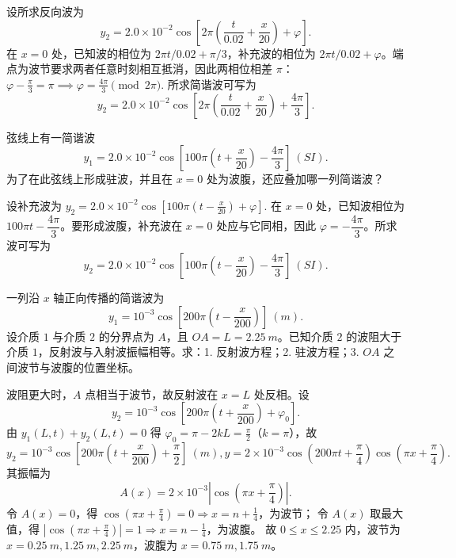 \begin{solution}
设所求反向波为
\[
y_2=2.0\times10^{-2}\cos\!\left[2\pi\left(\frac{t}{0.02}+\frac{x}{20}\right)+\varphi\right].
\]
在 \(x=0\) 处，已知波的相位为 \(2\pi t/0.02+\pi/3\)，补充波的相位为 \(2\pi t/0.02+\varphi\)。端点为波节要求两者任意时刻相互抵消，因此两相位相差 \(\pi\)：
 \(\varphi-\frac{\pi}{3}=\pi \implies \varphi=\frac{4\pi}{3}\pmod{2\pi}.\) 
所求简谐波可写为
\[
y_2=2.0\times10^{-2}\cos\!\left[2\pi\left(\frac{t}{0.02}+\frac{x}{20}\right)+\frac{4\pi}{3}\right].
\]
\end{solution}

\begin{exercise}[2005级期末：补出使 \(x=0\) 为波腹的反向波]
弦线上有一简谐波
\[
y_1=2.0\times10^{-2}\cos\!\left[100\pi\left(t+\frac{x}{20}\right)-\frac{4\pi}{3}\right]\ (\si{SI}).
\]
为了在此弦线上形成驻波，并且在 \(x=0\) 处为波腹，还应叠加哪一列简谐波？
\end{exercise}

\begin{solution}
设补充波为
 \(y_2=2.0\times10^{-2}\cos\!\left[100\pi\left(t-\frac{x}{20}\right)+\varphi\right].\) 
在 \(x=0\) 处，已知波相位为 \(100\pi t-\dfrac{4\pi}{3}\)。要形成波腹，补充波在 \(x=0\) 处应与它同相，因此 \(\varphi=-\dfrac{4\pi}{3}\)。所求波可写为
\[
y_2=2.0\times10^{-2}\cos\!\left[100\pi\left(t-\frac{x}{20}\right)-\frac{4\pi}{3}\right]\ (\si{SI}).
\]
\end{solution}

\begin{exercise}[波阻更大时反射波为什么要先带一个 \(\pi\)]
一列沿 \(x\) 轴正向传播的简谐波为
\[
y_1=10^{-3}\cos\!\left[200\pi\left(t-\frac{x}{200}\right)\right]\ (\si{m}).
\]
设介质 \(1\) 与介质 \(2\) 的分界点为 \(A\)，且 \(OA=L=\SI{2.25}{m}\)。已知介质 \(2\) 的波阻大于介质 \(1\)，反射波与入射波振幅相等。求：1. 反射波方程；2. 驻波方程；3. \(OA\) 之间波节与波腹的位置坐标。
\end{exercise}

\begin{solution}
波阻更大时，\(A\) 点相当于波节，故反射波在 \(x=L\) 处反相。设
\[
y_2=10^{-3}\cos\!\left[200\pi\left(t+\frac{x}{200}\right)+\varphi_0\right].
\]
由 \(y_1(L,t)+y_2(L,t)=0\) 得 \(\varphi_0=\pi-2kL=\frac{\pi}{2}\)（\(k=\pi\)），故
\[
y_2=10^{-3}\cos\!\left[200\pi\left(t+\frac{x}{200}\right)+\frac{\pi}{2}\right]\ (\si{m}),
y=2\times10^{-3}\cos\!\left(200\pi t+\frac{\pi}{4}\right)\cos\!\left(\pi x+\frac{\pi}{4}\right).
\]
其振幅为
\[
A(x)=2\times10^{-3}\left|\cos\!\left(\pi x+\frac{\pi}{4}\right)\right|.
\]
令 \(A(x)=0\)，得 \(\cos\!\left(\pi x+\frac{\pi}{4}\right)=0\Rightarrow x=n+\frac14\)，为波节；
令 \(A(x)\) 取最大值，得 \(\left|\cos\!\left(\pi x+\frac{\pi}{4}\right)\right|=1\Rightarrow x=n-\frac14\)，为波腹。
故 \(0\le x\le2.25\) 内，波节为 \(x=\SI{0.25}{m},\SI{1.25}{m},\SI{2.25}{m}\)，波腹为 \(x=\SI{0.75}{m},\SI{1.75}{m}\)。
\end{solution}


